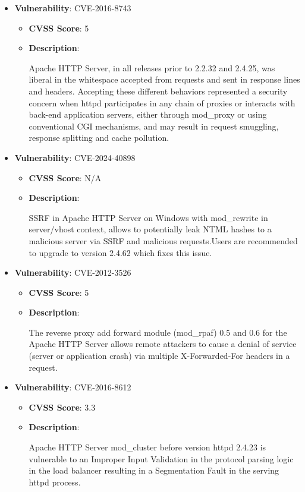 \documentclass{article}
\begin{document}
\begin{itemize}
        \item \textbf{Vulnerability}: CVE-2016-8743
        \begin{itemize}
            \item \textbf{CVSS Score}:  5 
            \item \textbf{Description}:
            \parbox[t]{0.9\linewidth}{
                \ttfamily Apache HTTP Server, in all releases prior to 2.2.32 and 2.4.25, was liberal in the whitespace accepted from requests and sent in response lines and headers. Accepting these different behaviors represented a security concern when httpd participates in any chain of proxies or interacts with back-end application servers, either through mod\_proxy or using conventional CGI mechanisms, and may result in request smuggling, response splitting and cache pollution.
            }
        \end{itemize}
    
        \item \textbf{Vulnerability}: CVE-2024-40898
        \begin{itemize}
            \item \textbf{CVSS Score}:  N/A 
            \item \textbf{Description}:
            \parbox[t]{0.9\linewidth}{
                \ttfamily SSRF in Apache HTTP Server on Windows with mod\_rewrite in server/vhost context, allows to potentially leak NTML hashes to a malicious server via SSRF and malicious requests.Users are recommended to upgrade to version 2.4.62 which fixes this issue.
            }
        \end{itemize}
    
        \item \textbf{Vulnerability}: CVE-2012-3526
        \begin{itemize}
            \item \textbf{CVSS Score}:  5 
            \item \textbf{Description}:
            \parbox[t]{0.9\linewidth}{
                \ttfamily The reverse proxy add forward module (mod\_rpaf) 0.5 and 0.6 for the Apache HTTP Server allows remote attackers to cause a denial of service (server or application crash) via multiple X-Forwarded-For headers in a request.
            }
        \end{itemize}
    
        \item \textbf{Vulnerability}: CVE-2016-8612
        \begin{itemize}
            \item \textbf{CVSS Score}:  3.3 
            \item \textbf{Description}:
            \parbox[t]{0.9\linewidth}{
                \ttfamily Apache HTTP Server mod\_cluster before version httpd 2.4.23 is vulnerable to an Improper Input Validation in the protocol parsing logic in the load balancer resulting in a Segmentation Fault in the serving httpd process.
            }
        \end{itemize}
    

\end{itemize}
\end{document}

